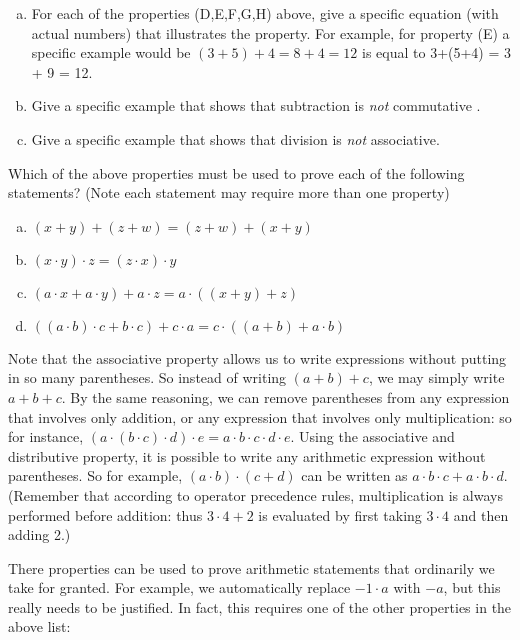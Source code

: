 \begin{exercise}{1}
\begin{enumerate}[(a)]
\item
For each of the properties (D,E,F,G,H)  above, give a specific equation (with actual numbers) that illustrates the property.
For example, for property (E) a specific example would be  $(3+5)+4 = 8 + 4 = 12$ is equal to 3+(5+4) = 3 + 9 = 12. 
\item
Give a specific example  that shows that subtraction  is \emph{not} commutative 
.\item
Give a specific example  that shows that division is \emph{not} associative. 
\end{enumerate}
\end{exercise}

\begin{exercise}{}
Which of the above properties must be used to prove each of the following statements? (Note each statement may require more than one property)
\begin{enumerate}[(a)]
\item
$(x+y)+(z+w) = (z+w)+(x+y)$
\item
$(x \cdot y) \cdot z = ( z \cdot  x) \cdot y$
\item
$(a\cdot x + a \cdot y) + a \cdot z = a \cdot ( (x+y) + z)$
\item
$((a \cdot b) \cdot c + b \cdot c) + c \cdot a = c \cdot ((a+b) + a \cdot b)$
\end{enumerate}
\end{exercise} 

Note that the associative property allows us to write expressions without putting in so many parentheses.  So instead of writing $(a+b)+c$, we may simply write $a+b+c$. By the same reasoning, we can remove parentheses from any expression that involves only addition, or any expression that involves only multiplication: so for instance, $(a \cdot (b \cdot c) \cdot d) \cdot e = a \cdot b \cdot c \cdot d \cdot e$. Using the associative and distributive property, it is possible to write any arithmetic expression without parentheses. So for example, $(a \cdot b) \cdot (c + d)$ can be written as $a \cdot b \cdot c + a \cdot b \cdot d$.  (Remember that according to operator precedence rules, multiplication is always performed before addition: thus $3 \cdot 4 + 2$ is evaluated by first taking $3 \cdot 4$ and then adding 2.)

There properties can be used to prove arithmetic statements that ordinarily we take for granted.  For example, we automatically replace $-1 \cdot a$ with $-a$, but this really needs to be justified. In fact, this requires one of the other properties in the above list:


